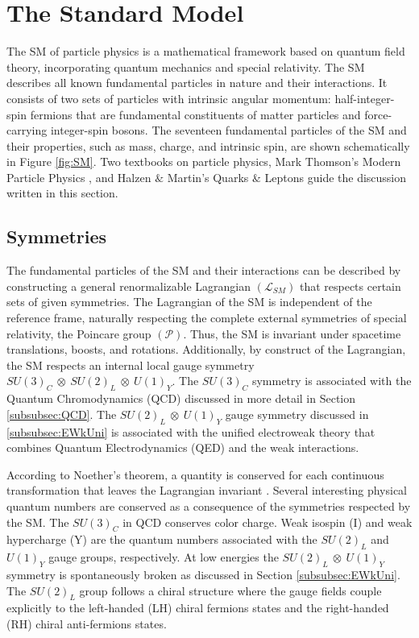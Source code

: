 \section{The Standard Model}
\label{sec:SM}

The SM of particle physics is a mathematical framework based on quantum field theory, incorporating quantum mechanics and special relativity. The SM describes all known fundamental particles in nature and their interactions. It consists of two sets of particles with intrinsic angular momentum: half-integer-spin fermions that are fundamental constituents of matter particles and force-carrying integer-spin bosons. The seventeen fundamental particles of the SM and their properties, such as mass, charge, and intrinsic spin, are shown schematically in Figure \ref{fig:SM}. Two textbooks on particle physics, Mark Thomson's Modern Particle Physics \cite{Thomson:2013zua}, and Halzen $\&$ Martin's Quarks $\&$ Leptons \cite{Halzen:1984mc} guide the discussion written in this section.

\subsection{Symmetries}
\label{subsec:Symmetries}
The fundamental particles of the SM and their interactions can be described by constructing a general renormalizable Lagrangian $(\mathcal{L}_{SM})$ that respects certain sets of given symmetries. The Lagrangian of the SM is independent of the reference frame, naturally respecting the complete external symmetries of special relativity, the Poincare group $(\mathcal{P})$. Thus, the SM is invariant under spacetime translations, boosts, and rotations. Additionally, by construct of the Lagrangian, the SM respects an internal local gauge symmetry $SU(3)_{C}~\otimes~SU(2)_{L}~\otimes~U(1)_{Y}$. The $SU(3)_{C}$ symmetry is associated with the Quantum Chromodynamics (QCD) discussed in more detail in Section \ref{subsubsec:QCD}. The $SU(2)_{L}~\otimes~U(1)_{Y}$ gauge symmetry discussed in \ref{subsubsec:EWkUni} is associated with the unified electroweak theory that combines Quantum Electrodynamics (QED) and the weak interactions. 

According to Noether's theorem, a quantity is conserved for each continuous transformation that leaves the Lagrangian invariant \cite{NoetherTheorem}. Several interesting physical quantum numbers are conserved as a consequence of the symmetries respected by the SM. The $SU(3)_{C}$ in QCD conserves color charge. Weak isospin (I) and weak hypercharge (Y) are the quantum numbers associated with the $SU(2)_{L}$ and $U(1)_{Y}$ gauge groups, respectively. At low energies the $SU(2)_{L}~\otimes~U(1)_{Y}$ symmetry is spontaneously broken as discussed in Section \ref{subsubsec:EWkUni}. The $SU(2)_{L}$ group follows a chiral structure where the gauge fields couple explicitly to the left-handed (LH) chiral fermions states and the right-handed (RH) chiral anti-fermions states.

